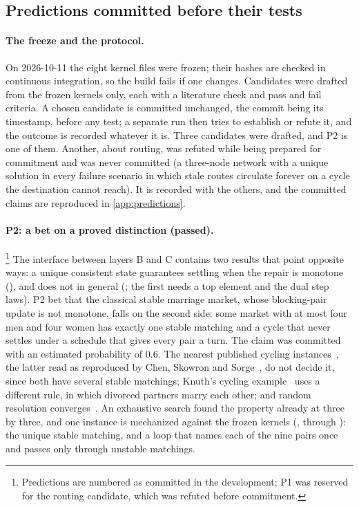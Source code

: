\subsection{Predictions committed before their tests}\label{sec:tests-predictions}

\paragraph{The freeze and the protocol.}
On 2026-10-11 the eight kernel files were frozen; their hashes are checked in continuous integration,
so the build fails if one changes. Candidates were drafted from the frozen kernels only, each with a
literature check and pass and fail criteria. A chosen candidate is committed unchanged, the commit
being its timestamp, before any test; a separate run then tries to establish or refute it, and the
outcome is recorded whatever it is. Three candidates were drafted, and P2 is one of them.
Another, about routing, was refuted while being prepared for commitment and was never committed (a three-node network with a
unique solution in every failure scenario in which stale routes circulate forever on a cycle the
destination cannot reach). It is recorded with the others, and the committed claims are reproduced in
\cref{app:predictions}.

\paragraph{P2: a bet on a proved distinction (passed).}\footnote{Predictions are numbered as committed in the development; P1 was
reserved for the routing candidate, which was refuted before commitment.}
The interface between layers B and C contains two results that point opposite ways: a unique
consistent state guarantees settling when the repair is monotone (), and does not
in general (; the first needs a top element and the dual step laws).
P2 bet that the classical stable marriage market,
whose blocking-pair update is not monotone, falls on the second side: some market with at most four
men and four women has exactly one stable matching and a cycle that never settles under a schedule
that gives every pair a turn. The claim was committed with an estimated probability of 0.6. The
nearest published cycling instances~\cite{ackermann2011,tamura1993}, the latter read as reproduced
by Chen, Skowron and Sorge~\cite{chen2019}, do not decide it, since both have several stable matchings;
Knuth's cycling example~\cite{knuth1976} uses a different rule, in which divorced partners marry each
other; and random resolution converges~\cite{roth1990}. An exhaustive search found
the property already at three by three, and one instance is mechanized against the frozen kernels
(, through ): the unique stable matching, and a loop that names each
of the nine pairs once and passes only through unstable matchings.

